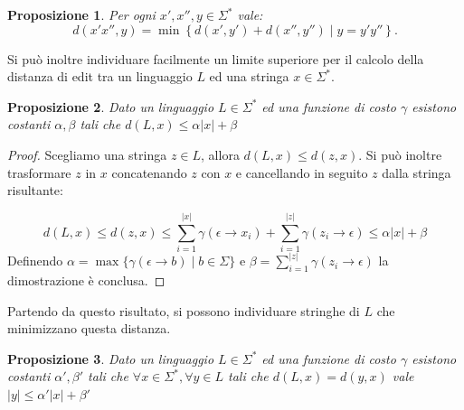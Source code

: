 \documentclass[a4paper,12pt]{report}
\theoremstyle{propositionstyle}
\newtheorem{prop}{Proposizione}[chapter]
\begin{document}
    \begin{prop}
        Per ogni $x', x'', y \in \Sigma^*$ vale:
        \[
            d\left(x'x'', y\right) = \min\left\{d\left(x', y'\right) + d\left(x'', y''\right) \mid y = y'y''\right\}.
        \]
    \end{prop}

    Si può inoltre individuare facilmente un limite superiore per il calcolo della distanza di edit
    tra un linguaggio $L$ ed una stringa $x \in \Sigma^*$.

    \begin{prop}
        \label{prop:distanza-limitata}
        Dato un linguaggio $L \in \Sigma^*$ ed una funzione di costo $\gamma$ esistono costanti $\alpha, \beta$ tali che
        $d\left(L, x\right) \leq \alpha \lvert x \rvert + \beta$
    \end{prop}

    \begin{proof}
        Scegliamo una stringa $z \in L$, allora $d\left(L, x\right) \leq d\left(z, x\right)$.
        Si può inoltre trasformare $z$ in $x$ concatenando $z$ con $x$ e cancellando in seguito $z$ dalla stringa risultante:

        \[
            \displaystyle d\left(L, x\right) \leq d\left(z, x\right) \leq \sum_{i=1}^{|x|} \gamma(\epsilon \rightarrow x_i) + \sum_{i=1}^{|z|} \gamma(z_i \rightarrow \epsilon) \leq \alpha |x| + \beta
        \]
        Definendo $\alpha = \max\{\gamma(\epsilon \rightarrow b) \mid b \in \Sigma\}$ e $\beta = \sum_{i=1}^{|z|} \gamma(z_i \rightarrow \epsilon)$ la dimostrazione è conclusa.
    \end{proof}

    Partendo da questo risultato, si possono individuare stringhe di $L$ che minimizzano questa distanza.

    \begin{prop}
        \label{prop:stringa-limitata}
        Dato un linguaggio $L \in \Sigma^*$ ed una funzione di costo $\gamma$ esistono costanti $\alpha', \beta'$ tali che
        $\forall{x \in \Sigma^*}, \forall{y \in L}$ tali che $d\left(L, x\right) = d\left(y, x\right)$ vale $\lvert y \rvert \leq \alpha' \lvert x \rvert + \beta'$
    \end{prop}
\end{document}
